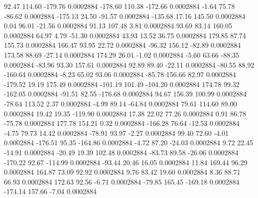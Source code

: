        92.47      114.60     -179.76     0.0002884
     -178.60      110.38     -172.66     0.0002884
       -1.64       75.78      -86.62     0.0002884
     -175.13       24.50      -91.57     0.0002884
     -135.68       17.16      145.50     0.0002884
        0.04       96.01      -21.56     0.0002884
       91.13      107.48        3.81     0.0002884
       93.69       83.14      160.05     0.0002884
       64.97        4.79      -51.30     0.0002884
       43.93       13.52       36.75     0.0002884
      179.85       87.74      155.73     0.0002884
      166.47       93.95       22.72     0.0002884
      -96.32      156.12      -82.89     0.0002884
      173.58       88.69      -27.14     0.0002884
      174.29       26.01       -1.02     0.0002884
       -5.60       63.66      -88.35     0.0002884
      -83.96       93.30      157.61     0.0002884
       92.89       89.40      -22.11     0.0002884
      -80.55       88.92     -160.64     0.0002884
       -8.23       65.02       93.06     0.0002884
      -85.78      156.66       82.97     0.0002884
     -179.52       19.19      175.49     0.0002884
     -101.19      101.49     -104.20     0.0002884
      174.78       99.32     -162.05     0.0002884
      -91.51       82.55     -176.68     0.0002884
       94.67      156.39      100.99     0.0002884
      -78.64      113.52        2.37     0.0002884
       -4.99       89.14      -64.84     0.0002884
       79.61      114.60       89.00     0.0002884
       19.42       19.35     -119.90     0.0002884
       17.38       22.02       77.26     0.0002884
        0.91       86.78      -75.78     0.0002884
      177.78      154.21        0.32     0.0002884
     -166.28       76.64      -12.53     0.0002884
       -4.75       79.73       14.42     0.0002884
      -78.91       93.97       -2.27     0.0002884
       99.40       72.60       -4.01     0.0002884
     -176.51       95.35     -164.86     0.0002884
       -4.72       87.20      -24.03     0.0002884
        9.72       22.45      -14.91     0.0002884
      -20.49       19.39      102.48     0.0002884
      -83.73       89.58      -26.06     0.0002884
     -170.22       92.67     -114.99     0.0002884
      -93.44       20.46       16.05     0.0002884
       11.84      169.44       96.29     0.0002884
      164.87       73.09       92.92     0.0002884
        9.76       83.42       19.60     0.0002884
        8.36       88.71       66.93     0.0002884
      172.63       92.56       -6.71     0.0002884
      -79.85      165.45     -169.18     0.0002884
     -174.14      157.66       -7.04     0.0002884
